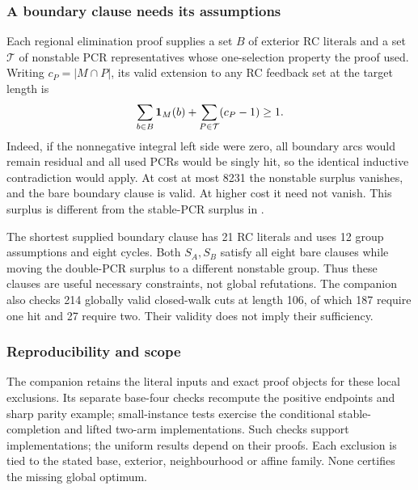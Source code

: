 \subsubsection{A boundary clause needs its assumptions}
Each regional elimination proof supplies a set $B$ of exterior
RC literals and a set $\mathcal T$ of nonstable PCR representatives
whose one-selection property the proof used. Writing
$c_P=|M\cap P|$, its valid extension to any RC feedback set at
the target length is
\begin{equation}
 \sum_{b\in B}\mathbf 1_M(b)+\sum_{P\in\mathcal T}(c_P-1)\ge1.
 \label{eq:regional-surplus}
\end{equation}
Indeed, if the nonnegative integral left side were zero, all
boundary arcs would remain residual and all used PCRs would
be singly hit, so the identical inductive contradiction would
apply. At cost at most 8231 the nonstable surplus vanishes,
and the bare boundary clause is valid. At higher cost it need
not vanish. This surplus is different from the stable-PCR
surplus in .

The shortest supplied boundary clause has 21 RC literals and
uses 12 group assumptions and eight cycles. Both $S_A,S_B$
satisfy all eight bare clauses while moving the double-PCR
surplus to a different nonstable group. Thus these clauses
are useful necessary constraints, not global refutations.
The companion also checks 214 globally valid closed-walk cuts
at length 106, of which 187 require one hit and 27 require two.
Their validity does not imply their sufficiency.

\subsubsection{Reproducibility and scope}
The companion retains the literal inputs and exact proof objects for these
local exclusions. Its separate base-four checks recompute the positive
endpoints and sharp parity example; small-instance tests exercise the
conditional stable-completion and lifted two-arm implementations. Such
checks support implementations; the uniform results depend on their proofs.
Each exclusion is tied to the stated base, exterior, neighbourhood or affine
family. None certifies the missing global optimum.
